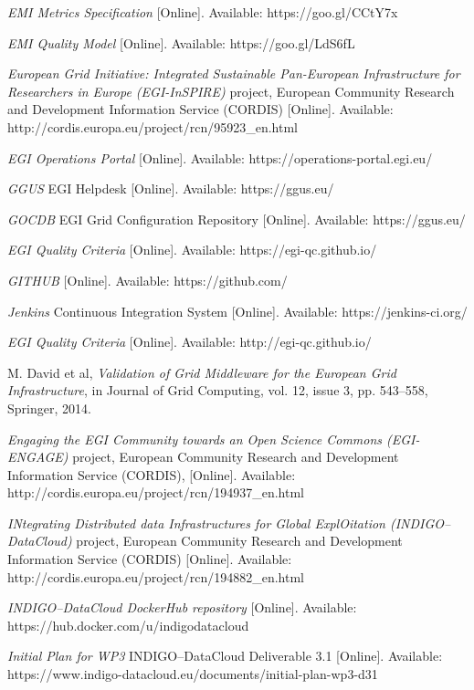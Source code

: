 \documentclass[journal]{IEEEtran}
\begin{document}
\begin{thebibliography}{1}
\emph{EMI Metrics Specification} [Online]. Available: https://goo.gl/CCtY7x

\emph{EMI Quality Model} [Online]. Available: https://goo.gl/LdS6fL

\emph{European Grid Initiative: Integrated Sustainable Pan-European
Infrastructure for Researchers in Europe (EGI-InSPIRE)} project, European
Community Research and Development Information Service (CORDIS) [Online]. Available:
http://cordis.europa.eu/project/rcn/95923\_en.html

\emph{EGI Operations Portal} [Online]. Available:
https://operations-portal.egi.eu/

\emph{GGUS} EGI Helpdesk [Online]. Available:
https://ggus.eu/

\emph{GOCDB} EGI Grid Configuration Repository [Online]. Available:
https://ggus.eu/

\emph{EGI Quality Criteria} [Online]. Available:
https://egi-qc.github.io/

\emph{GITHUB} [Online]. Available:
https://github.com/

\emph{Jenkins} Continuous Integration System [Online]. Available:
https://jenkins-ci.org/

\emph{EGI Quality Criteria} [Online]. Available: http://egi-qc.github.io/

M. David et al, \emph{Validation of Grid Middleware for the European Grid
Infrastructure}, in Journal of Grid Computing, vol. 12, issue 3, pp. 543–558,
Springer, 2014.

\emph{Engaging the EGI Community towards an Open Science Commons (EGI-ENGAGE)}
project, European Community Research and Development Information Service
(CORDIS), [Online]. Available:  http://cordis.europa.eu/project/rcn/194937\_en.html

\emph{INtegrating Distributed data Infrastructures for Global ExplOitation
(INDIGO--DataCloud)} project, European Community Research and Development
Information Service (CORDIS) [Online]. Available:
http://cordis.europa.eu/project/rcn/194882\_en.html

\emph{INDIGO--DataCloud DockerHub repository} [Online]. Available:
https://hub.docker.com/u/indigodatacloud

\emph{Initial Plan for WP3} INDIGO--DataCloud Deliverable 3.1 [Online]. Available:
https://www.indigo-datacloud.eu/documents/initial-plan-wp3-d31


\end{thebibliography}
\end{document}
